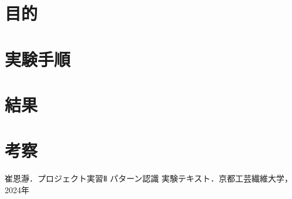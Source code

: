 \documentclass{jlreq}
\numberwithin{equation}{section}
\begin{document}
\tableofcontents
\clearpage

\section{目的}

\section{実験手順}

\section{結果}

\section{考察}

\begin{thebibliography}{9}
  \item 崔恩瀞．プロジェクト実習Ⅱ パターン認識 実験テキスト．京都工芸繊維大学，2024年
\end{thebibliography}
\end{document}
